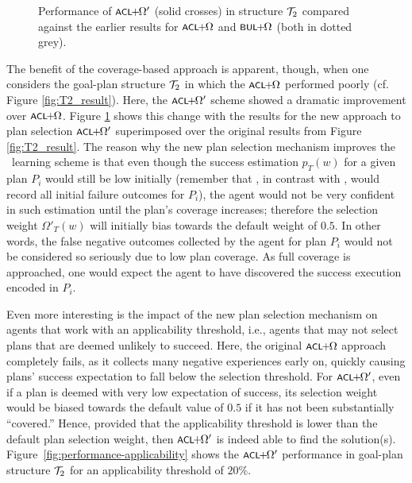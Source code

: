 \begin{figure}[t]
\begin{center}

\caption{Performance of $\CLSELB$ (solid crosses) in structure ${\mathcal{T}}_2$ compared against
the earlier results for $\CLSELA$ and $\BULSELA$ (both in dotted grey).}
\label{fig:T2_result2}
\end{center}
\end{figure}

The benefit of the coverage-based approach is apparent, though, when one
considers the goal-plan structure ${\mathcal{T}}_2$ in which the $\CLSELA$ performed
poorly (cf. Figure \ref{fig:T2_result}).
Here, the $\CLSELB$ scheme showed a dramatic improvement over $\CLSELA$. Figure
\ref{fig:T2_result2} shows this change with the results for the new approach to
plan selection $\CLSELB$ superimposed over the original results
from Figure \ref{fig:T2_result}.
The reason why the new plan selection mechanism improves the \CL\ learning scheme
is that even though the success estimation $p_T(w)$ for a given plan $P_i$ would
still be low initially (remember that \CL, in contrast with \BUL, would record
all initial failure outcomes for $P_i$), the agent would not be very confident in
such estimation until the plan's coverage increases; therefore the
selection weight $\Omega'_T(w)$ will initially bias towards the default weight of
$0.5$. In other words, the false negative outcomes collected by the agent for
plan $P_i$ would not be considered so seriously due to low plan coverage. As full
coverage is approached, one would expect the agent to have discovered the success
execution encoded in $P_i$.


Even more interesting is the impact of the new plan selection mechanism on
agents that work with an applicability threshold, i.e., agents that may not
select plans that are deemed unlikely to succeed.
Here, the original $\CLSELA$ approach completely fails, as it collects many
negative experiences early on, quickly causing plans' success expectation to fall
below the selection threshold. For $\CLSELB$, even if a plan is deemed with very
low expectation of success, its selection weight would be biased towards the
default value of $0.5$ if it has not been substantially ``covered.''
Hence, provided that the applicability threshold is lower than the default plan
selection weight, then $\CLSELB$ is indeed able to find the solution(s).
Figure~\ref{fig:performance-applicability} shows the $\CLSELB$ performance in
goal-plan structure ${\mathcal{T}}_2$ for an applicability threshold of $20\%$.


